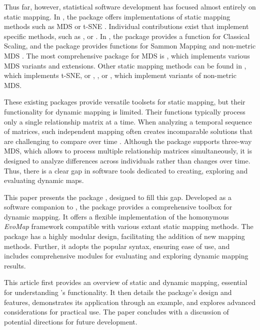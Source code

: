 \documentclass[article]{jss}
\begin{document}
Thus far, however, statistical software development has focused almost entirely on static mapping. 
In , the  package offers implementations of static mapping methods 
such as MDS or t-SNE \citep{Pedregosa+etal:2011}. Individual contributions exist that implement specific 
methods, such as  \citep{Perera:2023}, or  \citep{McInnes+Healy+Melville:2018}. 
In , the  package provides a function for Classical Scaling, and the  package
provides functions for Sammon Mapping and non-metric MDS \citep{Venables+Ripley:2002}. The
most comprehensive  package for MDS is  \citep{DeLeeuw+Mair:2009, Mair+Groenen+DeLeeuw:2022},
which implements various MDS variants and extensions. Other static mapping methods can be
found in  \citep{Krijthe:2015}, which implements t-SNE, or  \citep{Oksanen+etal:2022},
  \citep{Goslee+Urban:2007}, or  \citep{Le+Husson:2008}, which implement variants of 
 non-metric MDS.

 These existing packages provide versatile toolsets for static mapping, but their functionality for dynamic mapping is 
 limited. Their functions typically process only a single relationship matrix at a time. When analyzing a temporal sequence of matrices, such independent mapping often creates incomparable solutions that are 
challenging to compare over time \citep{Matthe+Ringel+Skiera:2023}. 
Although the  package supports three-way MDS, which allows to process multiple relationship matrices 
simultaneously, it is designed to analyze differences across individuals rather than changes over time. 
Thus, there is a clear gap in software tools dedicated to creating, exploring and evaluating dynamic maps. 

This paper presents the  package , designed to fill this gap. Developed 
as a software companion to \cite{Matthe+Ringel+Skiera:2023}, the  package provides 
a comprehensive toolbox for dynamic mapping. It offers a flexible implementation of the 
homonymous \emph{EvoMap} framework compatible with various extant static mapping methods. 
The package has a highly modular design, facilitating the addition of new mapping methods. Further, it adopts the
popular  syntax, ensuring ease of use, and includes comprehensive modules for evaluating and 
exploring dynamic mapping results.

This article first provides an overview of static and dynamic mapping, essential for understanding 's 
functionality. It then details the package's design and features, demonstrates its application through an example, 
and explores advanced considerations for practical use. The paper concludes with a discussion of
potential directions for future development.
\end{document}
